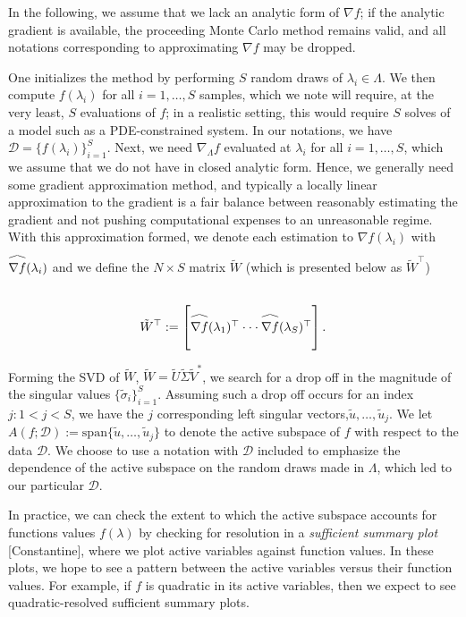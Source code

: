 \documentclass{amsart}
\newcommand\reallywidehat[1]{\arraycolsep=0pt\relax%
\begin{array}{c}
\stretchto{
  \scaleto{
    \scalerel*[\widthof{\ensuremath{#1}}]{\kern-.5pt\bigwedge\kern-.5pt}
    {\rule[-\textheight/2]{1ex}{\textheight}} %
  }{\textheight} %
}{0.5ex}\\           %
#1\\                 %
\rule{-1ex}{0ex}
\end{array}
}
\begin{document}
In the following, we assume that we lack an analytic form of $\nabla f$; if the analytic gradient is available, the proceeding Monte Carlo method remains valid, and all notations corresponding to approximating $\nabla f$ may be dropped.


One initializes the method by performing $S$ random draws of $\lambda_i \in \Lambda$. We then compute $f(\lambda_i)$ for all $i=1,\ldots,S$ samples, which we note will require, at the very least, $S$ evaluations of $f$; in a realistic setting, this would require $S$ solves of a model such as a PDE-constrained system. In our notations, we have $\mathcal{D}=\{f(\lambda_i)\}_{i=1}^S$. Next, we need $\nabla_\Lambda f$ evaluated at $\lambda_i$ for all $i=1,\ldots,S$, which we assume that we do not have in closed analytic form. Hence, we generally need some gradient approximation method, and typically a locally linear approximation to the gradient is a fair balance between reasonably estimating the gradient and not pushing computational expenses to an unreasonable regime. With this approximation formed, we denote each estimation to $\nabla f(\lambda_i)$ with $\reallywidehat{\nabla f}(\lambda_i)$ and we define the $N \times S$ matrix $\tilde{W}$ (which is presented below as $\tilde{W}^\top$)

\begin{equation} \label{eq:9}
\tilde{W}^\top:=\begin{bmatrix}
\reallywidehat{\nabla f}(\lambda_1)^\top
\cdot \cdot \cdot
\reallywidehat{\nabla f}(\lambda_S)^\top\\
\end{bmatrix}.
\end{equation}  

Forming the SVD of $\tilde{W}$, $\tilde{W}=\tilde{U}\tilde{\Sigma}\tilde{V}^*$, we search for a drop off in the magnitude of the singular values $\{\tilde{\sigma}_i\}_{i=1}^S$. Assuming such a drop off occurs for an index $j:1<j<S$, we have the $j$ corresponding left singular vectors,$ \tilde{u},\ldots,\tilde{u}_{j}$.  We let $A\left(f;\mathcal{D}\right):=\text{span}\{\tilde{u},\ldots,\tilde{u}_{j}\}$ to denote the active subspace of $f$ with respect to the data $\mathcal{D}$. We choose to use a notation with $\mathcal{D}$ included to emphasize the dependence of the active subspace on the random draws made in $\Lambda$, which led to our particular $\mathcal{D}$.

In practice, we can check the extent to which the active subspace accounts for functions values $f(\lambda)$ 
by checking for resolution in a \emph{sufficient summary plot} [Constantine], where we plot active variables against function values. In these plots, we hope to see a pattern between the active variables versus their function values. For example, if $f$ is quadratic in its active variables, then we expect to see quadratic-resolved sufficient summary plots.
\end{document}
